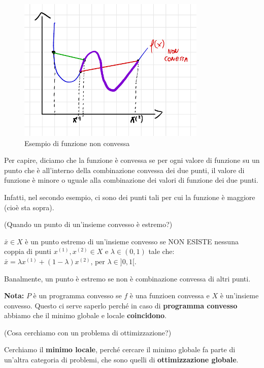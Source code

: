 \begin{definition}
    \begin{figure}[H]
        \centering
        \includegraphics[width=0.8\textwidth]{images/non conv.png}
        \caption{Esempio di funzione non convessa}
        \label{fig:esempio-di-funzione-non-convessa}
    \end{figure}

    Per capire, diciamo che la funzione è convessa se per ogni valore di funzione
    su un punto che è all'interno della combinazione convessa dei due punti, il
    valore di funzione è minore o uguale alla combinazione dei valori di funzione
    dei due punti.

    Infatti, nel secondo esempio, ci sono dei punti tali per cui la funzione è
    maggiore (cioè sta sopra).
\end{definition}

\begin{domanda}
    (Quando un punto di un'insieme convesso è estremo?)

    $\bar{x} \in X$ è un punto estremo di un'insieme convesso se NON ESISTE nessuna coppia di punti $x^{(1)}, x^{(2)} \in X$ e $\lambda \in (0,1)$ tale che:
    $\bar{x} = \lambda x^{(1)} + (1 - \lambda) x^{(2)}$, per $\lambda \in ]0,1[$.

    Banalmente, un punto è estremo se non è combinazione convessa di altri punti.
\end{domanda}

\textbf{Nota:} $P$ è un programma convesso se $f$ è una funzioen convessa e $X$ è un'insieme convesso. Questo ci serve saperlo perché in caso di
\textbf{programma convesso} abbiamo che il minimo globale e locale \textbf{coincidono}.

\begin{domanda}
    (Cosa cerchiamo con un problema di ottimizzazione?)

    Cerchiamo il \textbf{minimo locale}, perché cercare il minimo globale fa parte
    di un'altra categoria di problemi, che sono quelli di \textbf{ottimizzazione
        globale}.
\end{domanda}

